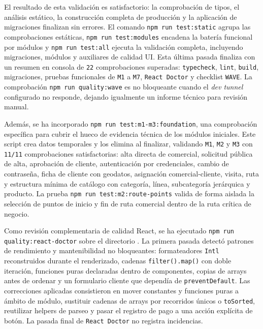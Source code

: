 El resultado de esta validación es satisfactorio: la comprobación de tipos, el análisis estático, la construcción completa de producción y la aplicación de migraciones finalizan sin errores. El comando \texttt{npm run test:static} agrupa las comprobaciones estáticas, \texttt{npm run test:modules} encadena la batería funcional por módulos y \texttt{npm run test:all} ejecuta la validación completa, incluyendo migraciones, módulos y auxiliares de calidad UI. Esta última pasada finaliza con un resumen en consola de \texttt{22} comprobaciones superadas: \texttt{typecheck}, \texttt{lint}, \texttt{build}, migraciones, pruebas funcionales de \texttt{M1} a \texttt{M7}, \texttt{React Doctor} y checklist \texttt{WAVE}. La comprobación \texttt{npm run quality:wave} es no bloqueante cuando el \textit{dev tunnel} configurado no responde, dejando igualmente un informe técnico para revisión manual.

Además, se ha incorporado \texttt{npm run test:m1-m3:foundation}, una comprobación específica para cubrir el hueco de evidencia técnica de los módulos iniciales. Este script crea datos temporales y los elimina al finalizar, validando \texttt{M1}, \texttt{M2} y \texttt{M3} con \texttt{11/11} comprobaciones satisfactorias: alta directa de comercial, solicitud pública de alta, aprobación de cliente, autenticación por credenciales, cambio de contraseña, ficha de cliente con geodatos, asignación comercial-cliente, visita, ruta y estructura mínima de catálogo con categoría, línea, subcategoría jerárquica y producto. La prueba \texttt{npm run test:m2:route-points} valida de forma aislada la selección de puntos de inicio y fin de ruta comercial dentro de la ruta crítica de negocio.

Como revisión complementaria de calidad React, se ha ejecutado \texttt{npm run quality:react-doctor} sobre el directorio . La primera pasada detectó patrones de rendimiento y mantenibilidad no bloqueantes: formateadores \texttt{Intl} reconstruidos durante el renderizado, cadenas \texttt{filter().map()} con doble iteración, funciones puras declaradas dentro de componentes, copias de arrays antes de ordenar y un formulario cliente que dependía de \texttt{preventDefault}. Las correcciones aplicadas consistieron en mover constantes y funciones puras a ámbito de módulo, sustituir cadenas de arrays por recorridos únicos o \texttt{toSorted}, reutilizar helpers de parseo y pasar el registro de pago a una acción explícita de botón. La pasada final de \texttt{React Doctor} no registra incidencias.

